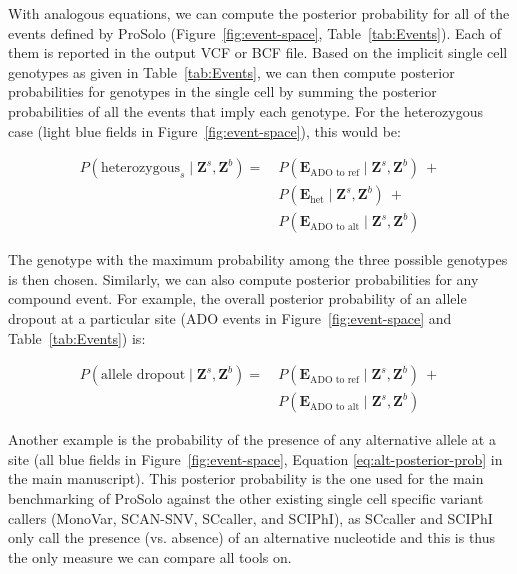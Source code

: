 \documentclass[authoryear,preprint,11pt]{scrartcl}
\newcommand{\Prob}{{P}}
\begin{document}
With analogous equations, we can compute the posterior probability for all of the events defined by ProSolo (Figure~\ref{fig:event-space}, Table~\ref{tab:Events}).
Each of them is reported in the output VCF or BCF file.
Based on the implicit single cell genotypes as given in Table~\ref{tab:Events}, we can then compute posterior probabilities for genotypes in the single cell by summing the posterior probabilities of all the events that imply each genotype.
For the heterozygous case (light blue fields in Figure~\ref{fig:event-space}), this would be:

\begin{equation}
 \label{eq:het-posterior-prob}
 \begin{split}
  \Prob(\text{heterozygous}_s \mid \boldsymbol{Z}^s,\boldsymbol{Z}^b) =~&
    \Prob(\boldsymbol{E}_{\text{ADO to ref}} \mid \boldsymbol{Z}^s,\boldsymbol{Z}^b)~+ \\
  &\Prob(\boldsymbol{E}_{\text{het}} \mid \boldsymbol{Z}^s,\boldsymbol{Z}^b)~+ \\
  &\Prob(\boldsymbol{E}_{\text{ADO to alt}} \mid \boldsymbol{Z}^s,\boldsymbol{Z}^b)
 \end{split}
\end{equation}

The genotype with the maximum probability among the three possible genotypes is then chosen.
Similarly, we can also compute posterior probabilities for any compound event.
For example, the overall posterior probability of an allele dropout at a particular site ({\ttfamily ADO} events in Figure~\ref{fig:event-space} and Table~\ref{tab:Events}) is:

\begin{equation}
 \label{eq:ado-posterior-prob}
 \begin{split}
  \Prob(\text{allele dropout} \mid \boldsymbol{Z}^s,\boldsymbol{Z}^b) =~&
    \Prob(\boldsymbol{E}_{\text{ADO to ref}} \mid \boldsymbol{Z}^s,\boldsymbol{Z}^b)~+ \\
  &\Prob(\boldsymbol{E}_{\text{ADO to alt}} \mid \boldsymbol{Z}^s,\boldsymbol{Z}^b)
 \end{split}
\end{equation}


Another example is the probability of the presence of any alternative allele at a site (all blue fields in Figure~\ref{fig:event-space}, Equation \ref{eq:alt-posterior-prob} in the main manuscript).
This posterior probability is the one used for the main benchmarking of ProSolo against the other existing single cell specific variant callers (MonoVar, SCAN-SNV, SCcaller, and SCIPhI), as SCcaller and SCIPhI only call the presence (vs. absence) of an alternative nucleotide and this is thus the only measure we can compare all tools on.
\end{document}

